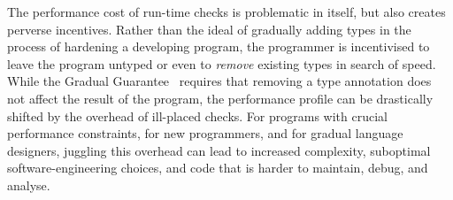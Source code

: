 The performance cost of run-time checks is problematic in itself,
but also creates perverse incentives. Rather than the ideal of
gradually adding types in the process of hardening a developing
program, the programmer is incentivised to leave the program untyped
or even to \textit{remove} existing types in search of speed.
%
While the Gradual Guarantee~\cite{XXXSiek2015} requires that
removing a type annotation does not affect the result of the
program, the performance profile can be drastically shifted by the
overhead of ill-placed checks.
%
For programs with crucial performance constraints, for new
programmers, and for gradual language designers, juggling this
overhead can lead to increased complexity, suboptimal
software-engineering choices, and code that is harder to maintain,
debug, and analyse.







